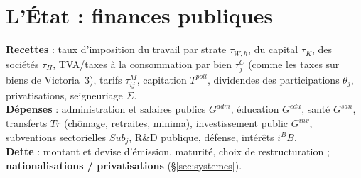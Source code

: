 \documentclass[11pt,a4paper]{article}
\begin{document}
\section{L'État : finances publiques}
\label{sec:etat}

\begin{joueur}
\textbf{Recettes} : taux d'imposition du travail par strate $\tau_{W,h}$, du capital $\tau_K$, des sociétés $\tau_\Pi$, TVA/taxes à la consommation par bien $\tau^C_j$ (comme les taxes sur biens de Victoria~3), tarifs $\tau^M_{ij}$, capitation $T^{poll}$, dividendes des participations $\theta_j$, privatisations, seigneuriage $\Sigma$.\\
\textbf{Dépenses} : administration et salaires publics $G^{adm}$, éducation $G^{edu}$, santé $G^{san}$, transferts $Tr$ (chômage, retraites, minima), investissement public $G^{inv}$, subventions sectorielles $Sub_j$, R\&D publique, défense, intérêts $i^B B$.\\
\textbf{Dette} : montant et devise d'émission, maturité, choix de restructuration ; \textbf{nationalisations / privatisations} (\S\ref{sec:systemes}).
\end{joueur}
\end{document}
